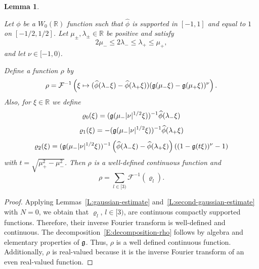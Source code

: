 \documentclass[12pt,reqno]{amsart}
\theoremstyle{plain}
\newtheorem{lemma}[theorem]{Lemma}
\numberwithin{equation}{section}
\theoremstyle{remark}
\newcommand{\uses}[1]{}
\newcommand{\usesdefs}[1]{}
\newcommand{\leanok}{}
\newcommand{\lean}[1]{}
\newcommand{\R}{{\mathbb R}}
\begin{document}
\begin{lemma}\label{L:gaussian-bump-decomposition}\uses{L:gaussian-estimate,L:second-gaussian-estimate}\usesdefs{gaussian,auto:Wiener-space-definition}
\lean{Auto.gaussianBumpDecomposition}
\leanok
Let $\phi$ be a $W_0(\R)$ function such that
$\widehat{\phi}$ is supported in $[-1,1]$ and equal to $1$ on $[-1/2,1/2]$.
Let $\mu_\pm,\lambda_\pm\in\mathbb R$ be positive and satisfy
\begin{equation}\label{E:assumption-on-mu-lambda}
2\mu_-\le 2\lambda_-\le \lambda_+\le \mu_+,
\end{equation}
and let $\nu\in [-1,0)$.

Define a function $\rho$ by
\begin{equation}\label{E:definition-rho}
\rho = \mathcal F^{-1}\left(\xi \mapsto (\widehat{\phi}(\lambda_-\xi) - \widehat{\phi}(\lambda_+\xi)) (\mathfrak{g}(\mu_- \xi)-\mathfrak{g}(\mu_+\xi))^{\nu}\right).
\end{equation}
Also, for $\xi \in \R$ we define
\begin{equation}\label{auto:four-scale-Gaussian-first-multiplier}
    \varrho_0(\xi)=(\mathfrak{g}(\mu_{-}|\nu|^{1/2}\xi))^{-1}\widehat{\phi}(\lambda_{-}\xi)
\end{equation}
\begin{equation}\label{auto:four-scale-Gaussian-second-multiplier}
    \varrho_1(\xi)=-(\mathfrak{g}(\mu_{-}|\nu|^{1/2}\xi))^{-1}\widehat{\phi}(\lambda_{+}\xi)
\end{equation}
\begin{equation}\label{auto:four-scale-Gaussian-remainder-multiplier}
    \varrho_2(\xi)=(\mathfrak{g}(\mu_{-}|\nu|^{1/2}\xi))^{-1}\left(\widehat{\phi}(\lambda_{-}\xi)-\widehat{\phi}(\lambda_{+}\xi)\right)\left((1-\mathfrak{g}(t\xi))^{\nu} -1\right)
\end{equation}
with $t=\sqrt{\mu_{+}^2-\mu_{-}^2}$.
Then $\rho$ is a well-defined continuous function and
\begin{equation}\label{E:decomposition-rho}
\rho=\sum_{l\in [3)} \mathcal F^{-1} (\varrho_l).
\end{equation}
\end{lemma}

\begin{proof}
Applying Lemmas~\ref{L:gaussian-estimate} and~\ref{L:second-gaussian-estimate} with $N=0$, we obtain that $\varrho_l$, $l\in [3)$, are continuous compactly supported functions. Therefore, their inverse Fourier transform is well-defined and continuous. The decomposition~\eqref{E:decomposition-rho} follows by algebra and elementary properties of $\mathfrak{g}$. Thus, $\rho$ is a well defined continuous function.
Additionally, $\rho$ is real-valued because it is the inverse Fourier transform of an even real-valued function.
\end{proof}
\end{document}
